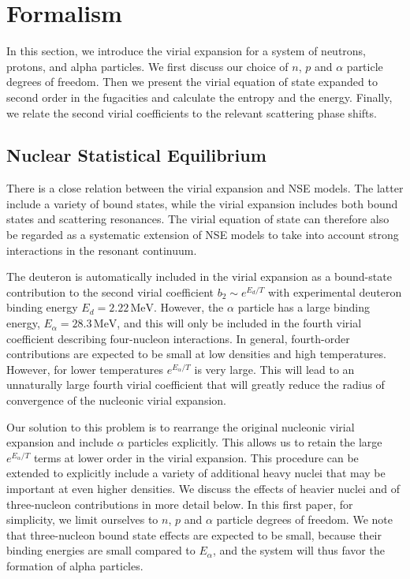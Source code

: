\documentclass[aps,prc,twocolumn,showpacs,showkeys,amsmath,amssymb]{revtex4}
\newcommand{\mev}{\, \text{MeV}}
\begin{document}
\section{Formalism}
\label{formalism}

In this section, we introduce the virial expansion for a system of 
neutrons, protons, and alpha particles.  We first discuss our choice 
of $n$, $p$ and $\alpha$ particle degrees of freedom.  Then we present 
the virial equation of state expanded to second order in the fugacities 
and calculate the entropy and the energy.  Finally, we relate the 
second virial coefficients to the relevant scattering phase shifts.

\subsection{Nuclear Statistical Equilibrium}

There is a close relation between the virial expansion and NSE models.
The latter include a variety of bound states, while the virial 
expansion includes both bound states and scattering resonances. The
virial equation of state can therefore also be regarded as a systematic
extension of NSE models to take into account strong interactions in 
the resonant continuum.

The deuteron is automatically included in the virial expansion as a 
bound-state contribution to the second virial coefficient $b_2 \sim
e^{E_d/T}$ with experimental deuteron binding energy $E_d=2.22 \mev$.
However, the $\alpha$ particle has a large binding energy, $E_\alpha = 
28.3 \mev$, and this will only be included in the fourth virial
coefficient describing four-nucleon interactions. In general,
fourth-order contributions are expected to be small at low densities 
and high temperatures.  However, for lower temperatures $e^{E_\alpha/T}$ 
is very large.  This will lead to an unnaturally large fourth virial 
coefficient that will greatly reduce the radius of convergence of the 
nucleonic virial expansion.

Our solution to this problem is to rearrange the original nucleonic
virial expansion and include $\alpha$ particles explicitly. This allows 
us to retain the large $e^{E_\alpha/T}$ terms at lower order in the
virial expansion.  This procedure can be extended to explicitly include 
a variety of additional heavy nuclei that may be important at even 
higher densities.  We discuss the effects of heavier nuclei and of 
three-nucleon contributions in more detail below. In this first paper, 
for simplicity, we limit ourselves to $n$, $p$ and $\alpha$ particle 
degrees of freedom.  We note that three-nucleon bound state effects 
are expected to be small, because their binding energies are small compared to 
$E_\alpha$, and the system will thus favor the formation of alpha particles.
\end{document}
